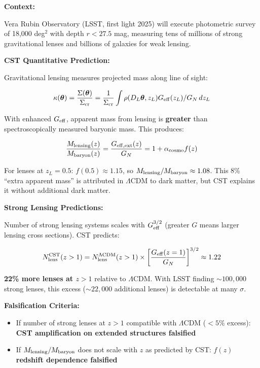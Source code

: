 \documentclass[11pt,a4paper]{article}
\providecommand{\tightlist}{\setlength{\itemsep}{0pt}\setlength{\parskip}{0pt}}
\begin{document}
\textbf{Context:}

Vera Rubin Observatory (LSST, first light 2025) will execute photometric
survey of 18,000 deg$^{2}$ with depth \(r < 27.5\) mag, measuring tens of
millions of strong gravitational lenses and billions of galaxies for
weak lensing.

\textbf{CST Quantitative Prediction:}

Gravitational lensing measures projected mass along line of sight:

\[\kappa(\boldsymbol\theta) = \frac{\Sigma(\boldsymbol\theta)}{\Sigma_{\rm cr}} = \frac{1}{\Sigma_{\rm cr}} \int \rho(D_L \boldsymbol\theta, z_L) G_{\rm eff}(z_L)/G_N \, dz_L\]

With enhanced \(G_{\rm eff}\), apparent mass from lensing is
\textbf{greater} than spectroscopically measured baryonic mass. This
produces:

\[\frac{M_{\rm lensing}(z)}{M_{\rm baryon}(z)} = \frac{G_{\rm eff,ext}(z)}{G_N} = 1 + \alpha_{\rm cosmo} f(z)\]

For lenses at \(z_L = 0.5\): \(f(0.5) \approx 1.15\), so
\(M_{\rm lensing}/M_{\rm baryon} \approx 1.08\). This 8\% ``extra
apparent mass'' is attributed in \(\Lambda\)CDM to dark matter, but CST
explains it without additional dark matter.

\textbf{Strong Lensing Predictions:}

Number of strong lensing systems scales with \(G_{\rm eff}^{3/2}\)
(greater \(G\) means larger lensing cross sections). CST predicts:

\[N_{\rm lens}^{\rm CST}(z > 1) = N_{\rm lens}^{\Lambda{\rm CDM}}(z > 1) \times \left[\frac{G_{\rm eff}(z=1)}{G_N}\right]^{3/2} \approx 1.22\]

\textbf{22\% more lenses at \(z > 1\)} relative to \(\Lambda\)CDM. With
LSST finding \(\sim 100,000\) strong lenses, this excess
(\(\sim 22,000\) additional lenses) is detectable at many \(\sigma\).

\textbf{Falsification Criteria:}

\begin{itemize}
\tightlist
\item
  If number of strong lenses at \(z > 1\) compatible with \(\Lambda\)CDM
  (\(< 5\%\) excess): \textbf{CST amplification on extended structures
  falsified}
\item
  If \(M_{\rm lensing}/M_{\rm baryon}\) does not scale with \(z\) as
  predicted by CST: \textbf{\(f(z)\) redshift dependence falsified}
\end{itemize}
\end{document}
